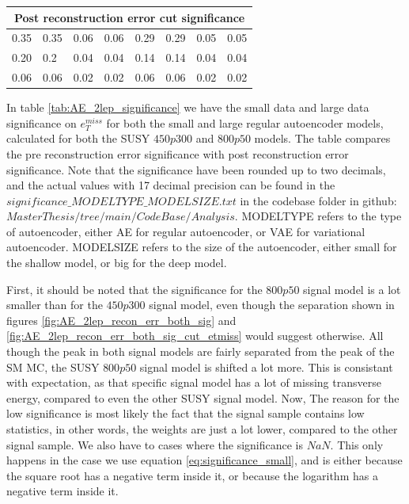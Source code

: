 \begin{table}[H]
\begin{tabular}{|llllllll|}
    \multicolumn{8}{|c|}{Post reconstruction error  cut significance}                                                                                                                         \\ \hline
    \multicolumn{1}{|l|}{0.35} & \multicolumn{1}{l|}{0.35} & \multicolumn{1}{l|}{0.06} & \multicolumn{1}{l|}{0.06} & \multicolumn{1}{l|}{0.29} & \multicolumn{1}{l|}{0.29} & \multicolumn{1}{l|}{0.05}   & \multicolumn{1}{l|}{0.05}  \\ \hline
    \multicolumn{1}{|l|}{0.20} & \multicolumn{1}{l|}{0.2} & \multicolumn{1}{l|}{0.04} & \multicolumn{1}{l|}{0.04} & \multicolumn{1}{l|}{0.14} & \multicolumn{1}{l|}{0.14} & \multicolumn{1}{l|}{0.04}   & \multicolumn{1}{l|}{0.04}  \\ \hline
    \multicolumn{1}{|l|}{0.06} & \multicolumn{1}{l|}{0.06} & \multicolumn{1}{l|}{0.02} & \multicolumn{1}{l|}{0.02} & \multicolumn{1}{l|}{0.06} & \multicolumn{1}{l|}{0.06} & \multicolumn{1}{l|}{0.02}   & \multicolumn{1}{l|}{0.02} \\ \hline
    \end{tabular}
\end{table}

In table \ref{tab:AE_2lep_significance} we have the small data and large data significance on $e_T^{miss}$ for both the small and large regular autoencoder models,
calculated for both the SUSY $450p300$ and $800p50$ models. The table compares the pre reconstruction error significance with post reconstruction error significance. 
Note that the significance have been rounded up to two decimals, and the actual values with 17 decimal precision can be found in the $significance\_MODELTYPE\_MODELSIZE.txt$ 
in the codebase folder in github: \href{https://github.com/Gadangadang/MasterThesis/tree/main/CodeBase/Analysis}{$MasterThesis/tree/main/CodeBase/Analysis$}. MODELTYPE 
refers to the type of autoencoder, either AE for regular autoencoder, or VAE for variational autoencoder. MODELSIZE refers to the size of the autoencoder, either small 
for the shallow model, or big for the deep model. \par 
First, it should be noted that the significance for the $800p50$ signal model is a lot smaller than for the $450p300$ signal model, even though the separation shown in 
figures \ref{fig:AE_2lep_recon_err_both_sig} and \ref{fig:AE_2lep_recon_err_both_sig_cut_etmiss} would suggest otherwise. All though the peak in both signal models are 
fairly separated from the peak of the SM MC, the SUSY $800p50$ signal model is shifted a lot more. This is consistant with expectation, as that specific signal model 
has a lot of missing transverse energy, compared to even the other SUSY signal model. Now, The reason for the low significance is most likely the fact that the signal sample 
contains low statistics, in other words, the weights are just a lot lower, compared to the other signal sample. We also have to cases where the significance is $NaN$. 
This only happens in the case we use equation \ref{eq:significance_small}, and is either because the square root has a negative term inside it, or because the logarithm 
has a negative term inside it. \par

